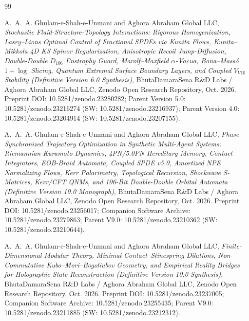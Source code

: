 \documentclass[11pt,a4paper,reqno]{article}
\def\texttt#1{#1}%
\def\mathrm#1{#1}%
\def\mathcal#1{#1}%
\def\mathbb#1{#1}%
\def\zenodo#1{10.5281/zenodo.#1}%
\newcommand{\zenodo}[1]{\href{https://doi.org/10.5281/zenodo.#1}{\texttt{10.5281/\allowbreak zenodo.#1}}}
\theoremstyle{plain}
\theoremstyle{definition}
\theoremstyle{remark}
\numberwithin{equation}{section}
\begin{document}
\clearpage
\begin{thebibliography}{99}

A.~A.~A. Ghulam-e-Shah-e-Unmani and {Aghora Abraham Global LLC},
\emph{Stochastic Fluid-Structure-Topology Interactions: Rigorous Homogenization, Lasry--Lions Optimal Control of Fractional SPDEs via Kunita Flows, Kunita--Mikkola 4D KS Spinor Regularization, Anisotropic Recoil Jump-Diffusion, Double-Double $\mathbb{D}_{106}$ Enstrophy Guard, Marolf--Maxfield $\alpha$-Vacua, Bona--Mass\'o $1+\log$ Slicing, Quantum Extremal Surface Boundary Layers, and Coupled $\mathcal{V}_{\mathrm{V10}}$ Stability (Definitive Version 6.0 Synthesis)},
BhutaDamaraSena R\&D Labs / Aghora Abraham Global LLC, Zenodo Open Research Repository, Oct. 2026.
\texttt{Preprint DOI:} \zenodo{23280282}; Parent Version 5.0: \zenodo{23216274} (SW: \zenodo{23216937}); Parent Version 4.0: \zenodo{23204914} (SW: \zenodo{23207155}).

A.~A.~A. Ghulam-e-Shah-e-Unmani and {Aghora Abraham Global LLC},
\emph{Phase-Synchronized Trajectory Optimization in Synthetic Multi-Agent Systems: Riemannian Kuramoto Dynamics, 4PN/5.0PN Hereditary Memory, Contact Integrators, EOB-Braid Automata, Coupled SPDE v5.0, Amortized NPE Normalizing Flows, Kerr Polarimetry, Topological Recursion, Shockwave S-Matrices, Kerr/CFT QNMs, and 106-Bit Double-Double Orbital Automata (Definitive Version 10.0 Monograph)},
BhutaDamaraSena R\&D Labs / Aghora Abraham Global LLC, Zenodo Open Research Repository, Oct. 2026.
\texttt{Preprint DOI:} \zenodo{23256017}; Companion Software Archive: \zenodo{23279863}; Parent V9.0: \zenodo{23210362} (SW: \zenodo{23210644}).

A.~A.~A. Ghulam-e-Shah-e-Unmani and {Aghora Abraham Global LLC},
\emph{Finite-Dimensional Modular Theory, Minimal Contact--Stinespring Dilations, Non-Commutative Kubo--Mori--Bogoliubov Geometry, and Empirical Reality Bridges for Holographic State Reconstruction (Definitive Version 10.0 Synthesis)},
BhutaDamaraSena R\&D Labs / Aghora Abraham Global LLC, Zenodo Open Research Repository, Oct. 2026.
\texttt{Preprint DOI:} \zenodo{23237005}; Companion Software Archive: \zenodo{23255435}; Parent V9.0: \zenodo{23211885} (SW: \zenodo{23212312}).


\end{thebibliography}
\end{document}
